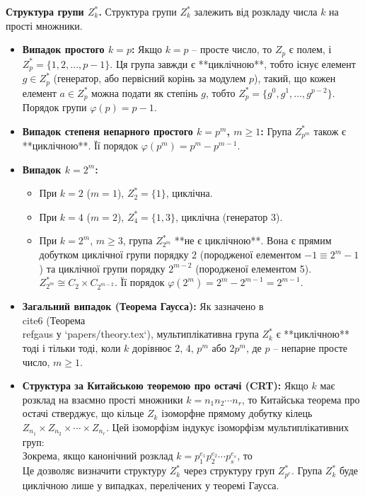 \documentclass[a4paper,12pt]{article}
\begin{document}
    \textbf{Структура групи \(Z_k^*\).} Структура групи \(Z_k^*\) залежить від розкладу числа \(k\) на прості множники.
    \begin{itemize}
        \item \textbf{Випадок простого \(k=p\):} Якщо \(k=p\) -- просте число, то \(Z_p\) є полем, і \(Z_p^* = \{1, 2, \ldots, p-1\}\). Ця група завжди є **циклічною**, тобто існує елемент \(g \in Z_p^*\) (генератор, або первісний корінь за модулем \(p\)), такий, що кожен елемент \(a \in Z_p^*\) можна подати як степінь \(g\), тобто \(Z_p^* = \{g^0, g^1, \ldots, g^{p-2}\}\). Порядок групи \(\varphi(p) = p-1\).
        \item \textbf{Випадок степеня непарного простого \(k=p^m\), \(m \ge 1\):} Група \(Z_{p^m}^*\) також є **циклічною**. Її порядок \(\varphi(p^m) = p^m - p^{m-1}\).
        \item \textbf{Випадок \(k=2^m\):}
        \begin{itemize}
            \item При \(k=2\) (\(m=1\)), \(Z_2^*=\{1\}\), циклічна.
            \item При \(k=4\) (\(m=2\)), \(Z_4^*=\{1, 3\}\), циклічна (генератор 3).
            \item При \(k=2^m\), \(m \ge 3\), група \(Z_{2^m}^*\) **не є циклічною**. Вона є прямим добутком циклічної групи порядку 2 (породженої елементом \(-1 \equiv 2^m-1\)) та циклічної групи порядку \(2^{m-2}\) (породженої елементом 5). \(Z_{2^m}^* \cong C_2 \times C_{2^{m-2}}\). Її порядок \(\varphi(2^m) = 2^m - 2^{m-1} = 2^{m-1}\).
        \end{itemize}
        \item \textbf{Загальний випадок (Теорема Гаусса):} Як зазначено в \\cite{6} (Теорема \\ref{gaus} у `papers/theory.tex`), мультиплікативна група \(Z_k^*\) є **циклічною** тоді і тільки тоді, коли \(k\) дорівнює 2, 4, \(p^m\) або \(2p^m\), де \(p\) -- непарне просте число, \(m \ge 1\).
        \item \textbf{Структура за Китайською теоремою про остачі (CRT):} Якщо \(k\) має розклад на взаємно прості множники \(k = n_1 n_2 \cdots n_r\), то Китайська теорема про остачі стверджує, що кільце \(Z_k\) ізоморфне прямому добутку кілець \(Z_{n_1} \times Z_{n_2} \times \cdots \times Z_{n_r}\). Цей ізоморфізм індукує ізоморфізм мультиплікативних груп:
        \\[ Z_k^* \cong Z_{n_1}^* \times Z_{n_2}^* \times \cdots \times Z_{n_r}^* \\]
        Зокрема, якщо канонічний розклад \(k = p_1^{e_1} p_2^{e_2} \cdots p_s^{e_s}\), то
        \\[ Z_k^* \cong Z_{p_1^{e_1}}^* \times Z_{p_2^{e_2}}^* \times \cdots \times Z_{p_s^{e_s}}^* \\]
        Це дозволяє визначити структуру \(Z_k^*\) через структуру груп \(Z_{p^e}^*\). Група \(Z_k^*\) буде циклічною лише у випадках, перелічених у теоремі Гаусса.
    \end{itemize}
\end{document}
